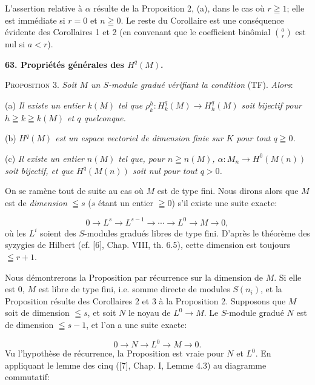 L'assertion relative à $\alpha$ résulte de la Proposition 2, (a), dans le cas où $r \geqq 1$; elle est immédiate si $r = 0$ et $n \geqq 0$. Le reste du Corollaire est une conséquence évidente des Corollaires 1 et 2 (en convenant que le coefficient binômial $\binom{a}{r}$ est nul si $a < r$).


\textbf{63. Propriétés générales des $H^q(M)$.}

\textsc{Proposition 3.} \textit{Soit $M$ un $S$-module gradué vérifiant la condition} (TF). \textit{Alors}:

(a) \textit{Il existe un entier $k(M)$ tel que $\rho_k^h : H_k^q(M) \to H_h^q(M)$ soit bijectif pour $h \geqq k \geqq k(M)$ et $q$ quelconque.}

(b) \textit{$H^q(M)$ est un espace vectoriel de dimension finie sur $K$ pour tout $q \geqq 0$.}

(c) \textit{Il existe un entier $n(M)$ tel que, pour $n \geqq n(M)$, $\alpha : M_n \to H^0(M(n))$ soit bijectif, et que $H^q(M(n))$ soit nul pour tout $q > 0$.}

On se ramène tout de suite au cas où $M$ est de type fini. Nous dirons alors que $M$ est de \textit{dimension} $\leqq s$ ($s$ étant un entier $\geqq 0$) s'il existe une suite exacte:

\begin{equation*}
0 \to L^s \to L^{s-1} \to \cdots \to L^0 \to M \to 0,
\end{equation*}
où les $L^i$ soient des $S$-modules gradués libres de type fini. D'après le théorème des syzygies de Hilbert (cf. [6], Chap. VIII, th. 6.5), cette dimension est toujours $\leqq r + 1$.

Nous démontrerons la Proposition par récurrence sur la dimension de $M$. Si elle est 0, $M$ est libre de type fini, i.e. somme directe de modules $S(n_i)$, et la Proposition résulte des Corollaires 2 et 3 à la Proposition 2. Supposons que $M$ soit de dimension $\leqq s$, et soit $N$ le noyau de $L^0 \to M$. Le $S$-module gradué $N$ est de dimension $\leqq s - 1$, et l'on a une suite exacte:

\begin{equation*}
0 \to N \to L^0 \to M \to 0.
\end{equation*}
Vu l'hypothèse de récurrence, la Proposition est vraie pour $N$ et $L^0$. En appliquant le lemme des cinq ([7], Chap. I, Lemme 4.3) au diagramme commutatif:

